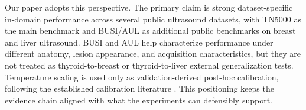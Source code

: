 Our paper adopts this perspective. The primary claim is strong dataset-specific in-domain performance across several public ultrasound datasets, with TN5000 as the main benchmark and BUSI/AUL as additional public benchmarks on breast and liver ultrasound. BUSI and AUL help characterize performance under different anatomy, lesion appearance, and acquisition characteristics, but they are not treated as thyroid-to-breast or thyroid-to-liver external generalization tests. Temperature scaling is used only as validation-derived post-hoc calibration, following the established calibration literature \cite{guo2017calibration}. This positioning keeps the evidence chain aligned with what the experiments can defensibly support.
